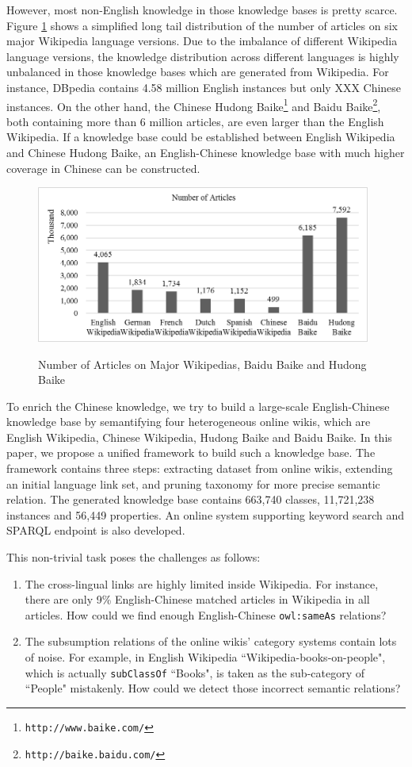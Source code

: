 \documentclass[runningheads,a4paper]{llncs}
\begin{document}
\begin{CJK*}{UTF8}{song}
However, most non-English knowledge in those knowledge bases is pretty scarce. Figure \ref{fig_stat} shows a simplified long tail distribution of the number of articles on six major Wikipedia language versions. Due to the imbalance of different Wikipedia language versions, the knowledge distribution across different languages is highly unbalanced in those knowledge bases which are generated from Wikipedia. For instance, DBpedia contains 4.58 million English instances but only XXX Chinese instances. On the other hand, the Chinese Hudong Baike\footnote{{\tt http://www.baike.com/}} and Baidu Baike\footnote{{\tt http://baike.baidu.com/}}, both containing more than 6 million articles, are even larger than the English Wikipedia. If a knowledge base could be established between English Wikipedia and Chinese Hudong Baike, an English-Chinese knowledge base with much higher coverage in Chinese can be constructed.
\begin{figure}[h]
\centering
  \includegraphics[width=11cm]{fig/fig_stat.png}\\
  \caption{Number of Articles on Major Wikipedias, Baidu Baike and Hudong Baike}
  \label{fig_stat}
\end{figure}

To enrich the Chinese knowledge, we try to build a large-scale English-Chinese knowledge base by semantifying four heterogeneous online wikis, which are English Wikipedia, Chinese Wikipedia, Hudong Baike and Baidu Baike. In this paper, we propose a unified framework to build such a knowledge base. The framework contains three steps: extracting dataset from online wikis, extending an initial language link set, and pruning taxonomy for more precise semantic relation. The generated knowledge base contains 663,740 classes, 11,721,238 instances and 56,449 properties. An online system supporting keyword search and SPARQL endpoint is also developed.

This non-trivial task poses the challenges as follows:
\begin{enumerate}
  \item The cross-lingual links are highly limited inside Wikipedia. For instance, there are only 9\% English-Chinese matched articles in Wikipedia in all articles. How could we find enough English-Chinese \verb"owl:sameAs" relations?
  \item The subsumption relations of the online wikis' category systems contain lots of noise. For example, in English Wikipedia ``Wikipedia-books-on-people", which is actually \verb"subClassOf" ``Books", is taken as the sub-category of ``People" mistakenly. How could we detect those incorrect semantic relations?
\end{enumerate}


\end{CJK*}
\end{document}
